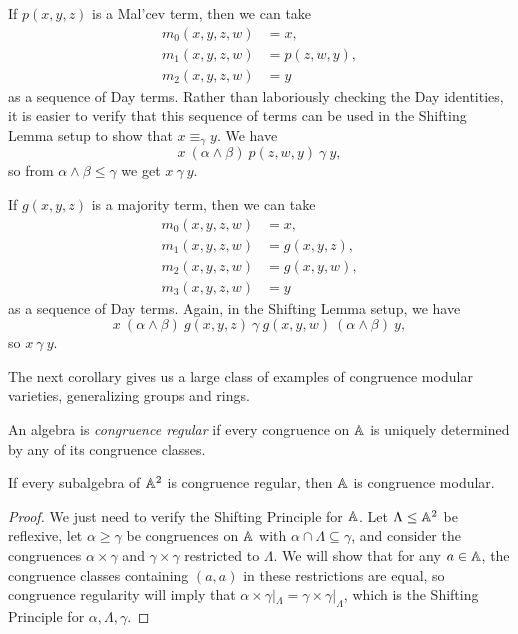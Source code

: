 \begin{appendices}

\begin{ex} If $p(x,y,z)$ is a Mal'cev term, then we can take
\begin{align*}
m_0(x,y,z,w) &= x,\\
m_1(x,y,z,w) &= p(z,w,y),\\
m_2(x,y,z,w) &= y
\end{align*}
as a sequence of Day terms. Rather than laboriously checking the Day identities, it is easier to verify that this sequence of terms can be used in the Shifting Lemma setup to show that $x \equiv_\gamma y$. We have
\[
x\ (\alpha \wedge \beta)\ p(z,w,y)\ \gamma\ y,
\]
so from $\alpha \wedge \beta \le \gamma$ we get $x\ \gamma\ y$.
\end{ex}

\begin{ex} If $g(x,y,z)$ is a majority term, then we can take
\begin{align*}
m_0(x,y,z,w) &= x,\\
m_1(x,y,z,w) &= g(x,y,z),\\
m_2(x,y,z,w) &= g(x,y,w),\\
m_3(x,y,z,w) &= y
\end{align*}
as a sequence of Day terms. Again, in the Shifting Lemma setup, we have
\[
x\ (\alpha\wedge\beta)\ g(x,y,z)\ \gamma\ g(x,y,w)\ (\alpha\wedge\beta)\ y,
\]
so $x\ \gamma\ y$.
\end{ex}

The next corollary gives us a large class of examples of congruence modular varieties, generalizing groups and rings.

\begin{defn} An algebra is \emph{congruence regular} if every congruence on $\mathbb{A}$ is uniquely determined by any of its congruence classes.
\end{defn}

\begin{cor} If every subalgebra of $\mathbb{A}^2$ is congruence regular, then $\mathbb{A}$ is congruence modular.
\end{cor}
\begin{proof} We just need to verify the Shifting Principle for $\mathbb{A}$. Let $\Lambda \le \mathbb{A}^2$ be reflexive, let $\alpha \ge \gamma$ be congruences on $\mathbb{A}$ with $\alpha \cap \Lambda \subseteq \gamma$, and consider the congruences $\alpha \times \gamma$ and $\gamma \times \gamma$ restricted to $\Lambda$. We will show that for any $a \in \mathbb{A}$, the congruence classes containing $(a,a)$ in these restrictions are equal, so congruence regularity will imply that $\alpha\times\gamma|_\Lambda = \gamma\times\gamma|_\Lambda$, which is the Shifting Principle for $\alpha,\Lambda,\gamma$.


\end{proof}
\end{appendices}
